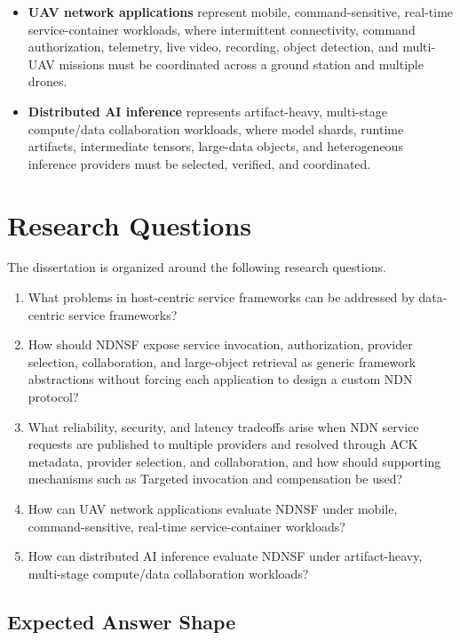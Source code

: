 \begin{itemize}
  \item \textbf{UAV network applications} represent mobile, command-sensitive,
  real-time service-container workloads, where intermittent connectivity,
  command authorization, telemetry, live video, recording, object detection,
  and multi-UAV missions must be coordinated across a ground station and
  multiple drones.
  \item \textbf{Distributed AI inference} represents artifact-heavy,
  multi-stage compute/data collaboration workloads, where model shards, runtime
  artifacts, intermediate tensors, large-data objects, and heterogeneous inference
  providers must be selected, verified, and coordinated.
\end{itemize}

\section{Research Questions}

The dissertation is organized around the following research questions.

\begin{enumerate}[label=RQ\arabic*., leftmargin=*]
  \item What problems in host-centric service frameworks can be addressed by
  data-centric service frameworks?
  \item How should NDNSF expose service invocation, authorization, provider
  selection, collaboration, and large-object retrieval as generic framework
  abstractions without forcing each application to design a custom NDN
  protocol?
  \item What reliability, security, and latency tradeoffs arise when NDN
  service requests are published to multiple providers and resolved through ACK
  metadata, provider selection, and collaboration, and how should supporting
  mechanisms such as Targeted invocation and compensation be used?
  \item How can UAV network applications evaluate NDNSF under mobile,
  command-sensitive, real-time service-container workloads?
  \item How can distributed AI inference evaluate NDNSF under artifact-heavy,
  multi-stage compute/data collaboration workloads?
\end{enumerate}

\subsection{Expected Answer Shape}

